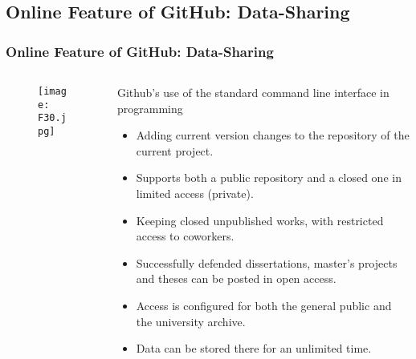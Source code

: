 \documentclass[pdflatex,compress,8pt,
	xcolor={dvipsnames,dvipsnames,svgnames,x11names,table},
	hyperref={
	breaklinks = true, 
	pdfauthor={Lemenkova Polina}, 
	pdfsubject={Preentation}, 
	pdfcreator={Lemenkova Polina}, 
	pdfproducer={Lemenkova Polina}, 
	colorlinks=true,linkcolor=blue, 
	citecolor=NavyBlue, 
	urlcolor = NavyBlue, 
	breaklinks = true}]{beamer}
\begin{document}
\subsection{Online Feature of GitHub: Data-Sharing}
\begin{frame}\frametitle{Online Feature of GitHub: Data-Sharing}
\begin{minipage}[0.4\textheight]{\textwidth}
\begin{columns}[T]
\begin{column}{0.5\textwidth}
\vspace{1em}
\begin{figure}[H]
	\centering
		\texttt{[image: F30.jpg]}
\end{figure}
\end{column}
\begin{column}{0.5\textwidth}
\vspace{2em} 
Github's use of the standard command line interface in programming
\begin{itemize}
	\item Adding current version changes to the repository of the current project.
	\item Supports both a public repository and a closed one in limited access (private).
	\item Keeping closed unpublished works, with restricted access to coworkers.
	\item Successfully defended dissertations, master's projects and theses can be posted in open access.
	\item Access is configured for both the general public and the university archive. 
	\item Data can be stored there for an unlimited time.
\end{itemize}
\end{column}
\end{columns}
\end{minipage}
\end{frame}
\end{document}
